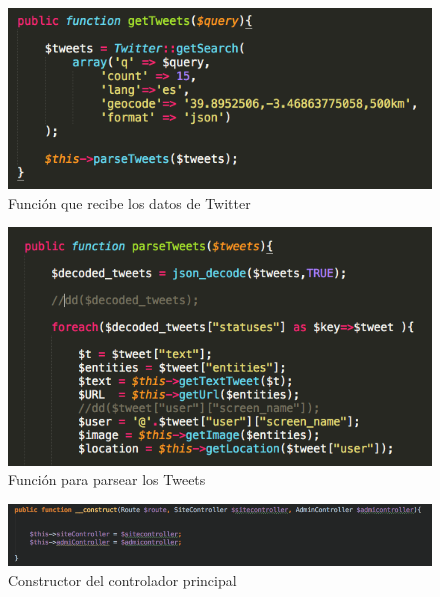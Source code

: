 \begin{figure}
\begin{center}
\includegraphics[width=1.0\textwidth]{imagenes/getTweets.png}
\caption{Función que recibe los datos de Twitter}
\label{getTweets-app}
\end{center}
\end{figure}

\begin{figure}
\begin{center}
\includegraphics[width=1.0\textwidth]{imagenes/parseTweets.png}
\caption{Función para parsear los Tweets}
\label{parseTweets-app}
\end{center}
\end{figure}

\begin{figure}
\begin{center}
\includegraphics[width=1.0\textwidth]{imagenes/controller-constructor.png}
\caption{Constructor del controlador principal}
\label{controller-construct}
\end{center}
\end{figure}

